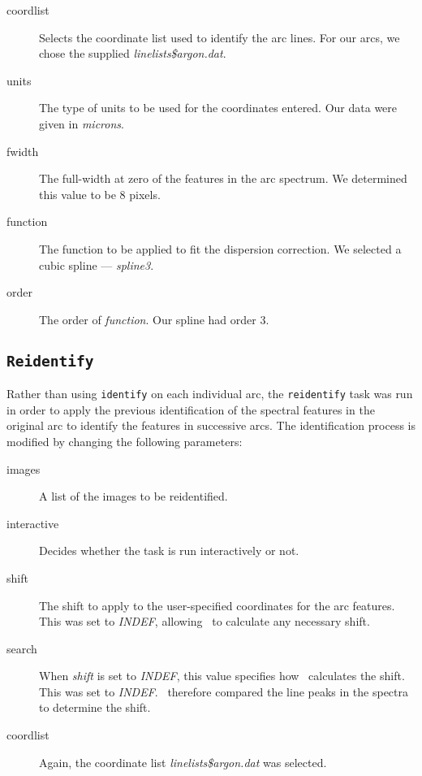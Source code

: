 \begin{description}

\item[coordlist]
Selects the coordinate list used to identify the arc lines. For our
arcs, we chose the supplied \textit{linelists\$argon.dat}. %

\item[units]
The type of units to be used for the coordinates entered. Our data were
given in \textit{microns}. %

\item[fwidth]
The full-width at zero of the features in the arc spectrum. We determined
this value to be 8 pixels. %

\item[function]
The function to be applied to fit the dispersion correction. We selected a
cubic spline --- \textit{spline3}. %

\item[order]
The order of \textit{function}. Our spline had order 3. %

\end{description}


\subsection{\texttt{Reidentify}}\label{cha:IRAF:sec:Spectroscopy:subsec:reidentify}

Rather than using \texttt{identify} on each individual arc, the
\texttt{reidentify} task was run in order to apply the previous
identification of the spectral features in the original arc to
identify the features in successive arcs. The identification process
is modified by changing the following parameters: %

\begin{description}

\item[images]
A list of the images to be reidentified. %

\item[interactive]
Decides whether the task is run interactively or not. %

\item[shift]
The shift to apply to the user-specified coordinates for the arc
features. This was set to \textit{INDEF}, allowing \iraf\ to calculate
any necessary shift. %

\item[search]
When \textit{shift} is set to \textit{INDEF}, this value specifies how
\iraf\ calculates the shift. This was set to \textit{INDEF}. \iraf\ therefore compared the line peaks in the spectra to determine the shift. %

\item[coordlist]
Again, the coordinate list \textit{linelists\$argon.dat} was selected. %

\end{description}

